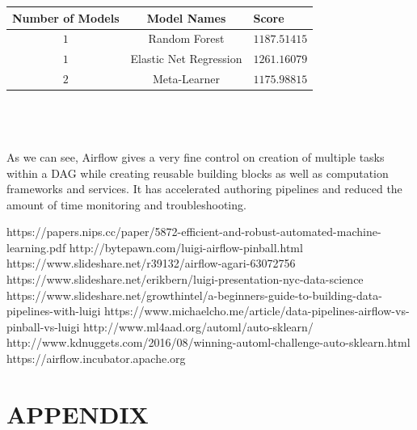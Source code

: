 \documentclass[10pt,onecolumn]{IEEEtran}
\begin{document}
{\small
\begin{tabulary}{\linewidth}{|C|C|L|}
\hline
\textbf{Number of Models} & \textbf{Model Names} & \textbf{Score} \\
\hline
$1$ & Random Forest & $1187.51415$  \\
\hline
$1$ & Elastic Net Regression & $1261.16079$  \\
\hline
$2$ & Meta-Learner & $1175.98815$ \\
\hline
\end{tabulary} 
} %
\\ \\ \\
As we can see, Airflow gives a very fine control on creation of multiple tasks within a DAG while creating reusable building blocks as well as computation frameworks and services. It has accelerated authoring pipelines and reduced the amount of time monitoring and troubleshooting. 

\begin{thebibliography}{99}

 https://papers.nips.cc/paper/5872-efficient-and-robust-automated-machine-learning.pdf
 http://bytepawn.com/luigi-airflow-pinball.html
 https://www.slideshare.net/r39132/airflow-agari-63072756
 https://www.slideshare.net/erikbern/luigi-presentation-nyc-data-science
 https://www.slideshare.net/growthintel/a-beginners-guide-to-building-data-pipelines-with-luigi
 https://www.michaelcho.me/article/data-pipelines-airflow-vs-pinball-vs-luigi
 http://www.ml4aad.org/automl/auto-sklearn/
 http://www.kdnuggets.com/2016/08/winning-automl-challenge-auto-sklearn.html
 https://airflow.incubator.apache.org

\end{thebibliography}

\section*{APPENDIX}
\end{document}

